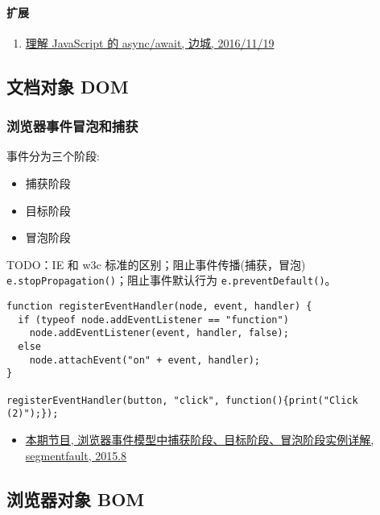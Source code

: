 \paragraph{扩展}\label{ux6269ux5c55-1}

\begin{enumerate}
\def\labelenumi{\arabic{enumi}.}
\tightlist
\item
  \href{https://segmentfault.com/a/1190000007535316}{理解 JavaScript 的
  async/await, 边城, 2016/11/19}
\end{enumerate}

\subsection{文档对象 DOM}\label{ux6587ux6863ux5bf9ux8c61-dom}

\subsubsection{浏览器事件冒泡和捕获}\label{ux6d4fux89c8ux5668ux4e8bux4ef6ux5192ux6ce1ux548cux6355ux83b7}

事件分为三个阶段:

\begin{itemize}
\tightlist
\item
  捕获阶段
\item
  目标阶段
\item
  冒泡阶段
\end{itemize}

TODO：IE 和 w3c 标准的区别；阻止事件传播(捕获，冒泡)
\lstinline!e.stopPropagation()!；阻止事件默认行为
\lstinline!e.preventDefault()!。

\begin{lstlisting}
function registerEventHandler(node, event, handler) {
  if (typeof node.addEventListener == "function")
    node.addEventListener(event, handler, false);
  else
    node.attachEvent("on" + event, handler);
}

registerEventHandler(button, "click", function(){print("Click (2)");});
\end{lstlisting}

\begin{itemize}
\tightlist
\item
  \href{http://segmentfault.com/a/1190000003482372}{本期节目,
  浏览器事件模型中捕获阶段、目标阶段、冒泡阶段实例详解, segmentfault,
  2015.8}
\end{itemize}

\subsection{浏览器对象 BOM}\label{ux6d4fux89c8ux5668ux5bf9ux8c61-bom}

